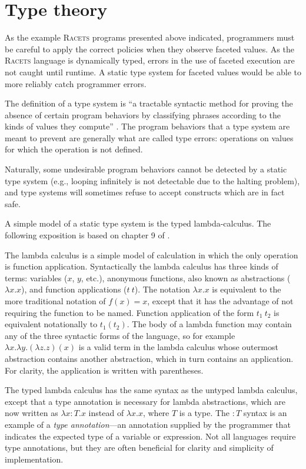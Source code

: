 \documentclass{article}
\begin{document}
\section{Type theory}
As the example \textsc{Racets} programs presented above indicated, programmers must be careful to apply the correct policies when they observe faceted values. As the \textsc{Racets} language is dynamically typed, errors in the use of faceted execution are not caught until runtime. A static type system for faceted values would be able to more reliably catch programmer errors.

The definition of a type system is ``a tractable syntactic method for proving the absence of certain program behaviors by classifying phrases according to the kinds of values they compute'' \cite{types}. The program behaviors that a type system are meant to prevent are generally what are called type errors: operations on values for which the operation is not defined.

Naturally, some undesirable program behaviors cannot be detected by a static type system (e.g., looping infinitely is not detectable due to the halting problem), and type systems will sometimes refuse to accept constructs which are in fact safe.

A simple model of a static type system is the typed lambda-calculus. The following exposition is based on chapter 9 of \cite{types}.

The lambda calculus is a simple model of calculation in which the only operation is function application. Syntactically the lambda calculus has three kinds of terms: variables ($x$, $y$, etc.), anonymous functions, also known as abstractions ($\lambda x . x$), and function applications ($t\ t$). The notation $\lambda x . x$ is equivalent to the more traditional notation of $f(x) = x$, except that it has the advantage of not requiring the function to be named. Function application of the form $t_1\ t_2$ is equivalent notationally to $t_1(t_2)$. The body of a lambda function may contain any of the three syntactic forms of the language, so for example $\lambda x . \lambda y . (\lambda z . z)(x)$ is a valid term in the lambda calculus whose outermost abstraction contains another abstraction, which in turn contains an application. For clarity, the application is written with parentheses.

The typed lambda calculus has the same syntax as the untyped lambda calculus, except that a type annotation is necessary for lambda abstractions, which are now written as $\lambda x: T . x$ instead of $\lambda x. x$, where $T$ is a type. The $: T$ syntax is an example of a \textit{type annotation}---an annotation supplied by the programmer that indicates the expected type of a variable or expression. Not all languages require type annotations, but they are often beneficial for clarity and simplicity of implementation.
\end{document}
